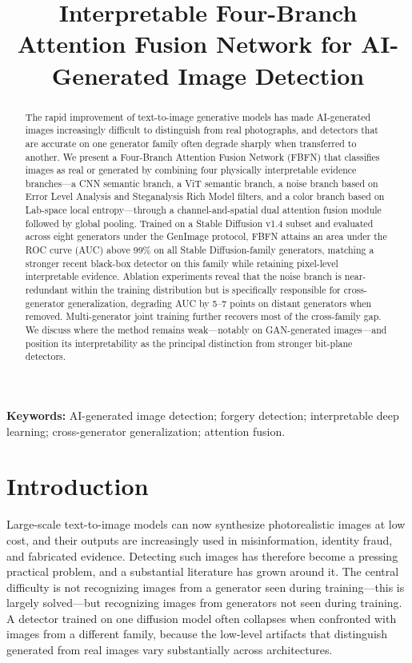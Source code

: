\documentclass[11pt,a4paper]{article}
\title{Interpretable Four-Branch Attention Fusion Network for AI-Generated Image Detection}
\date{}
\begin{document}
\maketitle

\begin{abstract}
\noindent
The rapid improvement of text-to-image generative models has made AI-generated images increasingly difficult to distinguish from real photographs, and detectors that are accurate on one generator family often degrade sharply when transferred to another. We present a Four-Branch Attention Fusion Network (FBFN) that classifies images as real or generated by combining four physically interpretable evidence branches---a CNN semantic branch, a ViT semantic branch, a noise branch based on Error Level Analysis and Steganalysis Rich Model filters, and a color branch based on Lab-space local entropy---through a channel-and-spatial dual attention fusion module followed by global pooling. Trained on a Stable Diffusion v1.4 subset and evaluated across eight generators under the GenImage protocol, FBFN attains an area under the ROC curve (AUC) above 99\% on all Stable Diffusion-family generators, matching a stronger recent black-box detector on this family while retaining pixel-level interpretable evidence. Ablation experiments reveal that the noise branch is near-redundant within the training distribution but is specifically responsible for cross-generator generalization, degrading AUC by 5--7 points on distant generators when removed. Multi-generator joint training further recovers most of the cross-family gap. We discuss where the method remains weak---notably on GAN-generated images---and position its interpretability as the principal distinction from stronger bit-plane detectors.
\end{abstract}

\noindent\textbf{Keywords:} AI-generated image detection; forgery detection; interpretable deep learning; cross-generator generalization; attention fusion.

\section{Introduction}

Large-scale text-to-image models can now synthesize photorealistic images at low cost, and their outputs are increasingly used in misinformation, identity fraud, and fabricated evidence. Detecting such images has therefore become a pressing practical problem, and a substantial literature has grown around it. The central difficulty is not recognizing images from a generator seen during training---this is largely solved---but recognizing images from generators not seen during training. A detector trained on one diffusion model often collapses when confronted with images from a different family, because the low-level artifacts that distinguish generated from real images vary substantially across architectures.
\end{document}
